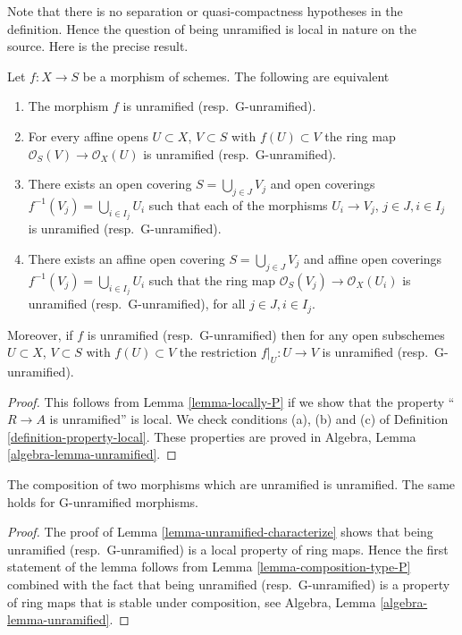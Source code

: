 \medskip\noindent
Note that there is no separation or quasi-compactness hypotheses in the
definition. Hence the question of being unramified is local in nature on
the source. Here is the precise result.

\begin{lemma}
\label{lemma-unramified-characterize}
Let $f : X \to S$ be a morphism of schemes.
The following are equivalent
\begin{enumerate}
\item The morphism $f$ is unramified (resp.\ G-unramified).
\item For every affine opens $U \subset X$, $V \subset S$
with $f(U) \subset V$ the ring map
$\mathcal{O}_S(V) \to \mathcal{O}_X(U)$ is unramified (resp.\ G-unramified).
\item There exists an open covering $S = \bigcup_{j \in J} V_j$
and open coverings $f^{-1}(V_j) = \bigcup_{i \in I_j} U_i$ such
that each of the morphisms $U_i \to V_j$, $j\in J, i\in I_j$
is unramified (resp.\ G-unramified).
\item There exists an affine open covering $S = \bigcup_{j \in J} V_j$
and affine open coverings $f^{-1}(V_j) = \bigcup_{i \in I_j} U_i$ such
that the ring map $\mathcal{O}_S(V_j) \to \mathcal{O}_X(U_i)$ is
unramified (resp.\ G-unramified), for all $j\in J, i\in I_j$.
\end{enumerate}
Moreover, if $f$ is unramified (resp.\ G-unramified) then for
any open subschemes $U \subset X$, $V \subset S$ with $f(U) \subset V$
the restriction $f|_U : U \to V$ is unramified (resp.\ G-unramified).
\end{lemma}

\begin{proof}
This follows from Lemma \ref{lemma-locally-P} if we show that
the property ``$R \to A$ is unramified'' is local.
We check conditions (a), (b) and (c) of Definition
\ref{definition-property-local}.
These properties are proved in
Algebra, Lemma \ref{algebra-lemma-unramified}.
\end{proof}

\begin{lemma}
\label{lemma-composition-unramified}
The composition of two morphisms which are unramified is unramified.
The same holds for G-unramified morphisms.
\end{lemma}

\begin{proof}
The proof of Lemma \ref{lemma-unramified-characterize}
shows that being unramified (resp.\ G-unramified)
is a local property of ring maps.
Hence the first statement of the lemma follows from
Lemma \ref{lemma-composition-type-P} combined
with the fact that being unramified (resp.\ G-unramified)
is a property of ring maps that is stable under composition, see
Algebra, Lemma \ref{algebra-lemma-unramified}.
\end{proof}

